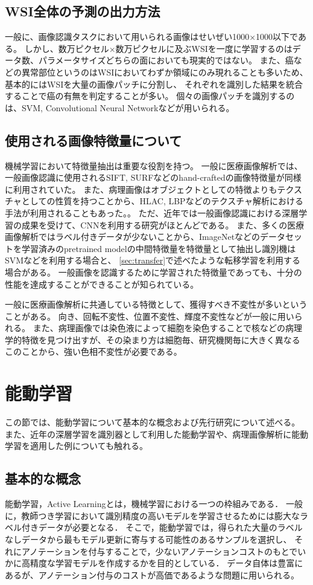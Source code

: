 \subsection{WSI全体の予測の出力方法}
一般に、画像認識タスクにおいて用いられる画像はせいぜい1000×1000以下である。
しかし、数万ピクセル×数万ピクセルに及ぶWSIを一度に学習するのはデータ数、パラメータサイズどちらの面においても現実的ではない。
また、癌などの異常部位というのはWSIにおいてわずか領域にのみ現れることも多いため、基本的にはWSIを大量の画像パッチに分割し、
それぞれを識別した結果を統合することで癌の有無を判定することが多い。
個々の画像パッチを識別するのは、SVM, Convolutional Neural Networkなどが用いられる。

\subsection{使用される画像特徴量について}
機械学習において特徴量抽出は重要な役割を持つ。
一般に医療画像解析では、一般画像認識に使用されるSIFT, SURFなどのhand-craftedの画像特徴量が同様に利用されていた。
また、病理画像はオブジェクトとしての特徴よりもテクスチャとしての性質を持つことから、HLAC, LBPなどのテクスチャ解析における手法が利用されることもあった。。
ただ、近年では一般画像認識における深層学習の成果を受けて、CNNを利用する研究がほとんどである。
また、多くの医療画像解析ではラベル付きデータが少ないことから、ImageNetなどのデータセットを学習済みのpretrained modelの中間特徴量を特徴量として抽出し識別機はSVMなどを利用する場合と、
\ref{sec:transfer}で述べたような転移学習を利用する場合がある。
一般画像を認識するために学習された特徴量であっても、十分の性能を達成することができることが知られている。

一般に医療画像解析に共通している特徴として、獲得すべき不変性が多いということがある。
向き、回転不変性、位置不変性、輝度不変性などが一般に用いられる。
また、病理画像では染色液によって細胞を染色することで核などの病理学的特徴を見つけ出すが、その染まり方は細胞毎、研究機関毎に大きく異なる
このことから、強い色相不変性が必要である。

\section{能動学習}

この節では、能動学習について基本的な概念および先行研究について述べる。
また、近年の深層学習を識別器として利用した能動学習や、病理画像解析に能動学習を適用した例についても触れる。

\subsection{基本的な概念}
能動学習，Active Learning\cite{settles2010active}とは，機械学習における一つの枠組みである．
一般に，教師つき学習において識別精度の高いモデルを学習させるためには膨大なラベル付きデータが必要となる．
そこで，能動学習では，得られた大量のラベルなしデータから最もモデル更新に寄与する可能性のあるサンプルを選択し、
それにアノテーションを付与することで，少ないアノテーションコストのもとでいかに高精度な学習モデルを作成するかを目的としている．
データ自体は豊富にあるが、アノテーション付与のコストが高価であるような問題に用いられる。

